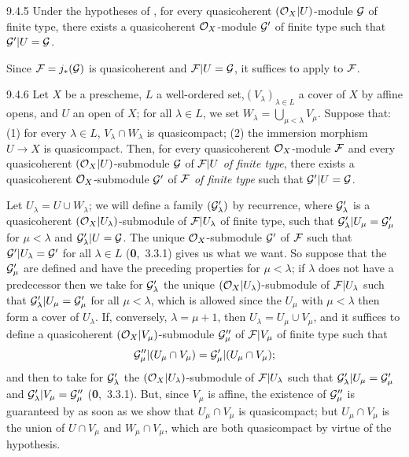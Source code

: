 \documentclass[../main.tex]{subfiles}
\begin{document}
\begin{env}[Corollary]{9.4.5}
Under the hypotheses of , for every quasicoherent $(\mathcal{O}_X|U)$-module
$\mathcal{G}$ of finite type, there exists a quasicoherent $\mathcal{O}_X$-module
$\mathcal{G}'$ of finite type such that $\mathcal{G}'|U=\mathcal{G}$.
\end{env}

Since $\mathcal{F}=j_\ast(\mathcal{G})$ is quasicoherent  and
$\mathcal{F}|U=\mathcal{G}$, it suffices to apply  to $\mathcal{F}$.

\begin{env}[Lemma]{9.4.6}
Let $X$ be a prescheme, $L$ a well-ordered set,$(V_\lambda)_{\lambda\in L}$ a cover
of $X$ by affine opens, and $U$ an open of
$X$; for all $\lambda\in L$, we set $W_\lambda=\bigcup_{\mu<\lambda}V_\mu$.
Suppose that: (1) for every $\lambda\in L$, $V_\lambda\cap W_\lambda$ is
quasicompact; (2) the immersion morphism $U\to X$ is quasicompact. Then, for
every quasicoherent $\mathcal{O}_X$-module $\mathcal{F}$ and every quasicoherent
$(\mathcal{O}_X|U)$-submodule $\mathcal{G}$ of $\mathcal{F}|U$ \emph{of finite type}, there
exists a quasicoherent $\mathcal{O}_X$-submodule $\mathcal{G}'$ of $\mathcal{F}$ \emph{of
finite type} such that $\mathcal{G}'|U=\mathcal{G}$.
\end{env}

Let $U_\lambda=U\cup W_\lambda$; we will define a family $(\mathcal{G}'_\lambda)$
by recurrence, where $\mathcal{G}'_\lambda$ is a quasicoherent
$(\mathcal{O}_X|U_\lambda)$-submodule of $\mathcal{F}|U_\lambda$ of finite type, such that
$\mathcal{G}'_\lambda|U_\mu=\mathcal{G}'_\mu$ for $\mu<\lambda$ and
$\mathcal{G}'_\lambda|U=\mathcal{G}$.  The unique $\mathcal{O}_X$-submodule $\mathcal{G}'$ of
$\mathcal{F}$ such that $\mathcal{G}'|U_\lambda=\mathcal{G}'$ for all $\lambda\in L$
(\textbf{0},~3.3.1) gives us what we want.  So suppose that the $\mathcal{G}'_\mu$
are defined and have the preceding properties for $\mu<\lambda$; if $\lambda$
does not have a predecessor then we take for $\mathcal{G}'_\lambda$ the unique
$(\mathcal{O}_X|U_\lambda)$-submodule of $\mathcal{F}|U_\lambda$ such that
$\mathcal{G}'_\lambda|U_\mu=\mathcal{G}'_\mu$ for all $\mu<\lambda$, which is
allowed since the $U_\mu$ with $\mu<\lambda$ then form a cover of $U_\lambda$.
If, conversely, $\lambda=\mu+1$, then $U_\lambda=U_\mu\cup V_\mu$, and it
suffices to define a quasicoherent $(\mathcal{O}_X|V_\mu)$-submodule $\mathcal{G}''_\mu$
of $\mathcal{F}|V_\mu$ of finite type such that
\[
  \mathcal{G}''_\mu|(U_\mu\cap V_\mu)=\mathcal{G}'_\mu|(U_\mu\cap V_\mu);
\]
and then to take for $\mathcal{G}'_\lambda$ the
$(\mathcal{O}_X|U_\lambda)$-submodule of $\mathcal{F}|U_\lambda$ such that
$\mathcal{G}'_\lambda|U_\mu=\mathcal{G}'_\mu$ and
$\mathcal{G}'_\lambda|V_\mu=\mathcal{G}''_\mu$ (\textbf{0},~3.3.1).  But, since
$V_\mu$ is affine, the existence of $\mathcal{G}''_\mu$ is guaranteed by 
as soon as we show that $U_\mu\cap V_\mu$ is quasicompact; but $U_\mu\cap
V_\mu$ is the union of $U\cap V_\mu$ and $W_\mu\cap V_\mu$, which are both
quasicompact by virtue of the hypothesis.
\end{document}
